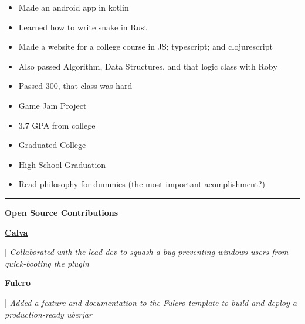 \documentclass[letterpaper,11pt]{article}
\newcommand{\resumeItem}[1]{
  \item\small{
    {#1 \vspace{-2pt}}
  }
}
\newcommand{\resumeItemListStart}{\begin{itemize}}
\newcommand{\resumeItemListEnd}{\end{itemize}\vspace{-5pt}}
\begin{document}
\resumeItemListStart
\resumeItem{ Made an android app in kotlin }
\resumeItemListEnd

\resumeItemListStart
\resumeItem{ Learned how to write snake in Rust }
\resumeItemListEnd

\resumeItemListStart
\resumeItem{ Made a website for a college course in JS;
	typescript; and clojurescript }
\resumeItemListEnd

\resumeItemListStart
\resumeItem{ Also passed Algorithm, Data Structures, and that logic class with Roby }
\resumeItemListEnd

\resumeItemListStart
\resumeItem{ Passed 300, that class was hard }
\resumeItemListEnd

\resumeItemListStart
\resumeItem{ Game Jam Project }
\resumeItemListEnd

\resumeItemListStart
\resumeItem{ 3.7 GPA from college }
\resumeItemListEnd


\resumeItemListStart
\resumeItem{ Graduated College }
\resumeItemListEnd

\resumeItemListStart
\resumeItem{ High School Graduation }
\resumeItemListEnd

\resumeItemListStart
\resumeItem{ Read philosophy for dummies (the most important acomplishment?) }
\resumeItemListEnd

\noindent\rule{19.5cm}{0.4pt}

\textbf{\large \textcolor{magic_blue}{Open Source Contributions}}

\begin{minipage}[t]{0.08\textwidth}
	\raggedright
	\href{https://github.com/BetterThanTomorrow/calva/issues/2325}{ \underline{\textbf{Calva}}} \\
\end{minipage}
\hfill
\begin{minipage}[t]{0.90\textwidth}
	\raggedright
	|\textit{ Collaborated with the lead dev to squash a bug preventing windows users from quick-booting the plugin } \\
\end{minipage}

\begin{minipage}[t]{0.08\textwidth}
	\raggedright
	\href{https://github.com/fulcrologic/fulcro-template/pull/28}{ \underline{\textbf{Fulcro}}} \\
\end{minipage}
\hfill
\begin{minipage}[t]{0.90\textwidth}
	\raggedright
	|\textit{ Added a feature and documentation to the Fulcro template to build and deploy a production-ready uberjar } \\
\end{minipage}
\end{document}
